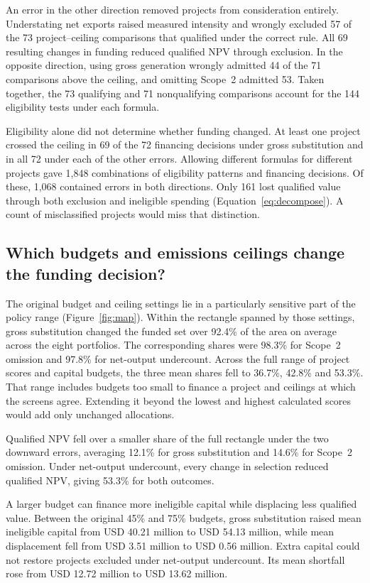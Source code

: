 An error in the other direction removed projects from consideration entirely. Understating net exports raised measured intensity and wrongly excluded 57 of the 73 project--ceiling comparisons that qualified under the correct rule. All 69 resulting changes in funding reduced qualified NPV through exclusion. In the opposite direction, using gross generation wrongly admitted 44 of the 71 comparisons above the ceiling, and omitting Scope~2 admitted 53. Taken together, the 73 qualifying and 71 nonqualifying comparisons account for the 144 eligibility tests under each formula.

Eligibility alone did not determine whether funding changed. At least one project crossed the ceiling in 69 of the 72 financing decisions under gross substitution and in all 72 under each of the other errors. Allowing different formulas for different projects gave 1,848 combinations of eligibility patterns and financing decisions. Of these, 1,068 contained errors in both directions. Only 161 lost qualified value through both exclusion and ineligible spending (Equation~\eqref{eq:decompose}). A count of misclassified projects would miss that distinction.


\subsection{Which budgets and emissions ceilings change the funding decision?}
The original budget and ceiling settings lie in a particularly sensitive part of the policy range (Figure~\ref{fig:map}). Within the rectangle spanned by those settings, gross substitution changed the funded set over 92.4\% of the area on average across the eight portfolios. The corresponding shares were 98.3\% for Scope~2 omission and 97.8\% for net-output undercount. Across the full range of project scores and capital budgets, the three mean shares fell to 36.7\%, 42.8\% and 53.3\%. That range includes budgets too small to finance a project and ceilings at which the screens agree. Extending it beyond the lowest and highest calculated scores would add only unchanged allocations.
\ifdefined\readingcopy\fi



Qualified NPV fell over a smaller share of the full rectangle under the two downward errors, averaging 12.1\% for gross substitution and 14.6\% for Scope~2 omission. Under net-output undercount, every change in selection reduced qualified NPV, giving 53.3\% for both outcomes.

A larger budget can finance more ineligible capital while displacing less qualified value. Between the original 45\% and 75\% budgets, gross substitution raised mean ineligible capital from USD 40.21 million to USD 54.13 million, while mean displacement fell from USD 3.51 million to USD 0.56 million. Extra capital could not restore projects excluded under net-output undercount. Its mean shortfall rose from USD 12.72 million to USD 13.62 million.

